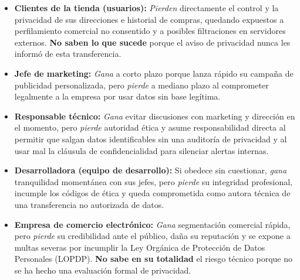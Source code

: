 \documentclass[12pt,a4paper,oneside]{article}
\begin{document}
\begin{itemize}[leftmargin=1.8em,itemsep=4pt]
    \item \textbf{Clientes de la tienda (usuarios):} \textit{Pierden} directamente el control y la privacidad de sus direcciones e historial de compras, quedando expuestos a perfilamiento comercial no consentido y a posibles filtraciones en servidores externos. \textbf{No saben lo que sucede} porque el aviso de privacidad nunca les informó de esta transferencia.
    \item \textbf{Jefe de marketing:} \textit{Gana} a corto plazo porque lanza rápido su campaña de publicidad personalizada, pero \textit{pierde} a mediano plazo al comprometer legalmente a la empresa por usar datos sin base legítima.
    \item \textbf{Responsable técnico:} \textit{Gana} evitar discusiones con marketing y dirección en el momento, pero \textit{pierde} autoridad ética y asume responsabilidad directa al permitir que salgan datos identificables sin una auditoría de privacidad y al usar mal la cláusula de confidencialidad para silenciar alertas internas.
    \item \textbf{Desarrolladora (equipo de desarrollo):} Si obedece sin cuestionar, \textit{gana} tranquilidad momentánea con sus jefes, pero \textit{pierde} su integridad profesional, incumple los códigos de ética y queda comprometida como autora técnica de una transferencia no autorizada de datos.
    \item \textbf{Empresa de comercio electrónico:} \textit{Gana} segmentación comercial rápida, pero \textit{pierde} su credibilidad ante el público, daña su reputación y se expone a multas severas por incumplir la Ley Orgánica de Protección de Datos Personales (LOPDP). \textbf{No sabe en su totalidad} el riesgo técnico porque no se ha hecho una evaluación formal de privacidad.
\end{itemize}
\end{document}
